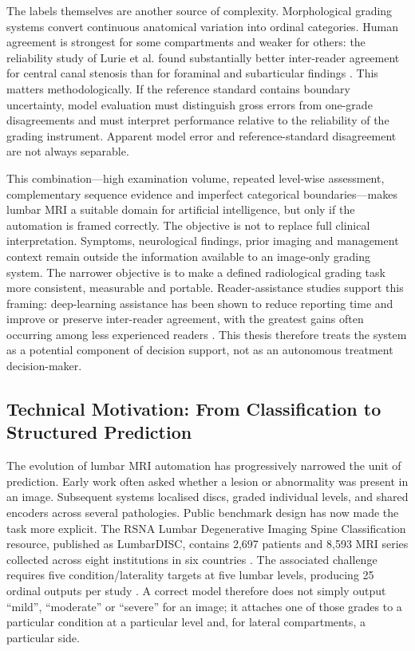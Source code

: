 The labels themselves are another source of complexity. Morphological grading
systems convert continuous anatomical variation into ordinal categories. Human
agreement is strongest for some compartments and weaker for others: the reliability
study of Lurie et al. found substantially better inter-reader agreement for central
canal stenosis than for foraminal and subarticular findings
\cite{lurie2008reliability}. This matters methodologically. If the reference standard
contains boundary uncertainty, model evaluation must distinguish gross errors from
one-grade disagreements and must interpret performance relative to the reliability
of the grading instrument. Apparent model error and reference-standard disagreement
are not always separable.

This combination---high examination volume, repeated level-wise assessment,
complementary sequence evidence and imperfect categorical boundaries---makes lumbar
MRI a suitable domain for artificial intelligence, but only if the automation is
framed correctly. The objective is not to replace full clinical interpretation.
Symptoms, neurological findings, prior imaging and management context remain outside
the information available to an image-only grading system. The narrower objective is
to make a defined radiological grading task more consistent, measurable and
portable. Reader-assistance studies support this framing: deep-learning assistance
has been shown to reduce reporting time and improve or preserve inter-reader
agreement, with the greatest gains often occurring among less experienced readers
\cite{lim2022improved}. This thesis therefore treats the system as a potential
component of decision support, not as an autonomous treatment decision-maker.

\subsection{Technical Motivation: From Classification to Structured Prediction}
\label{sec:intro-technical-motivation}

The evolution of lumbar MRI automation has progressively narrowed the unit of
prediction. Early work often asked whether a lesion or abnormality was present in an
image. Subsequent systems localised discs, graded individual levels, and shared
encoders across several pathologies. Public benchmark design has now made the task
more explicit. The RSNA Lumbar Degenerative Imaging Spine Classification resource,
published as LumbarDISC, contains 2,697 patients and 8,593 MRI series collected
across eight institutions in six countries \cite{richards2026the}. The associated
challenge requires five condition/laterality targets at five lumbar levels, producing
25 ordinal outputs per study \cite{rsna2024rsna,richards2026the}. A correct model
therefore does not simply output ``mild'', ``moderate'' or ``severe'' for an image;
it attaches one of those grades to a particular condition at a particular level and,
for lateral compartments, a particular side.

